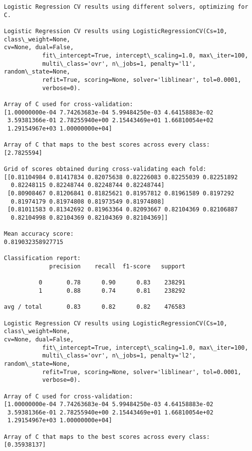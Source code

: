\documentclass[11pt]{article}
\begin{document}
    \begin{Verbatim}[commandchars=\\\{\},fontsize=\footnotesize]
Logistic Regression CV results using different solvers, optimizing for C.

Logistic Regression CV results using LogisticRegressionCV(Cs=10, class\_weight=None,
cv=None, dual=False,
           fit\_intercept=True, intercept\_scaling=1.0, max\_iter=100,
           multi\_class='ovr', n\_jobs=1, penalty='l1', random\_state=None,
           refit=True, scoring=None, solver='liblinear', tol=0.0001,
           verbose=0).

Array of C used for cross-validation:
[1.00000000e-04 7.74263683e-04 5.99484250e-03 4.64158883e-02
 3.59381366e-01 2.78255940e+00 2.15443469e+01 1.66810054e+02
 1.29154967e+03 1.00000000e+04]

Array of C that maps to the best scores across every class:
[2.7825594]

Grid of scores obtained during cross-validating each fold:
[[0.81104984 0.81417834 0.82075638 0.82226083 0.82255039 0.82251892
  0.82248115 0.82248744 0.82248744 0.82248744]
 [0.80908467 0.81206841 0.81825621 0.81957812 0.81961589 0.8197292
  0.81974179 0.81974808 0.81973549 0.81974808]
 [0.81011583 0.81342692 0.81963364 0.82093667 0.82104369 0.82106887
  0.82104998 0.82104369 0.82104369 0.82104369]]

Mean accuracy score:
0.819032358927715

Classification report:
             precision    recall  f1-score   support

          0       0.78      0.90      0.83    238291
          1       0.88      0.74      0.81    238292

avg / total       0.83      0.82      0.82    476583

Logistic Regression CV results using LogisticRegressionCV(Cs=10, class\_weight=None,
cv=None, dual=False,
           fit\_intercept=True, intercept\_scaling=1.0, max\_iter=100,
           multi\_class='ovr', n\_jobs=1, penalty='l2', random\_state=None,
           refit=True, scoring=None, solver='liblinear', tol=0.0001,
           verbose=0).

Array of C used for cross-validation:
[1.00000000e-04 7.74263683e-04 5.99484250e-03 4.64158883e-02
 3.59381366e-01 2.78255940e+00 2.15443469e+01 1.66810054e+02
 1.29154967e+03 1.00000000e+04]

Array of C that maps to the best scores across every class:
[0.35938137]


\end{Verbatim}
\end{document}
